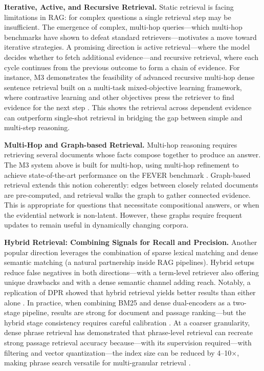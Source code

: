 \documentclass[11pt]{article}
\begin{document}
\textbf{Iterative, Active, and Recursive Retrieval.} Static retrieval is facing limitations in RAG: for complex questions a single retrieval step may be insufficient. The emergence of complex, multi-hop queries---which multi-hop benchmarks have shown to defeat standard retrievers---motivates a move toward iterative strategies. A promising direction is active retrieval---where the model decides whether to fetch additional evidence---and recursive retrieval, where each cycle continues from the previous outcome to form a chain of evidence. For instance, M3 demonstrates the feasibility of advanced recursive multi-hop dense sentence retrieval built on a multi-task mixed-objective learning framework, where contrastive learning and other objectives press the retriever to find evidence for the next step \cite{ref18}. This shows the retrieval across dependent evidence can outperform single-shot retrieval in bridging the gap between simple and multi-step reasoning.

\textbf{Multi-Hop and Graph-based Retrieval.} Multi-hop reasoning requires retrieving several documents whose facts compose together to produce an answer. The M3 system above is built for multi-hop, using multi-hop refinement to achieve state-of-the-art performance on the FEVER benchmark \cite{ref18}. Graph-based retrieval extends this notion coherently: edges between closely related documents are pre-computed, and retrieval walks the graph to gather connected evidence. This is appropriate for questions that necessitate compositional answers, or when the evidential network is non-latent. However, these graphs require frequent updates to remain useful in dynamically changing corpora.

\textbf{Hybrid Retrieval: Combining Signals for Recall and Precision.} Another popular direction leverages the combination of sparse lexical matching and dense semantic matching (a natural partnership inside RAG pipelines). Hybrid setups reduce false negatives in both directions---with a term-level retriever also offering unique drawbacks and with a dense semantic channel adding reach. Notably, a replication of DPR showed that hybrid retrieval yields better results than either alone \cite{ref16}. In practice, when combining BM25 and dense dual-encoders as a two-stage pipeline, results are strong for document and passage ranking---but the hybrid stage consistency requires careful calibration \cite{ref19}. At a coarser granularity, dense phrase retrieval has demonstrated that phrase-level retrieval can recreate strong passage retrieval accuracy because---with its supervision required---with filtering and vector quantization---the index size can be reduced by 4--10×, making phrase search versatile for multi-granular retrieval \cite{ref20}.
\end{document}
